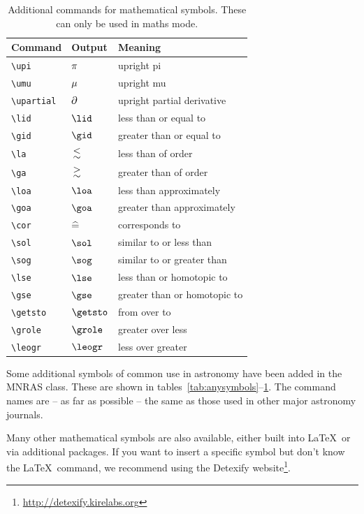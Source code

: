 \documentclass[a4paper,fleqn,usenatbib,useAMS]{mnras}
\begin{document}
\begin{table}
 \caption{Additional commands for mathematical symbols. These can only be used in maths mode.}
 \label{tab:mathssymbols}
 \begin{tabular}{lll}
  \hline
  Command & Output & Meaning\\
  \hline
  \verb'\upi' & $\pi$ & upright pi\\[2pt] %
  \verb'\umu' & $\mu$ & upright mu\\[2pt]
  \verb'\upartial' & $\partial$ & upright partial derivative\\[2pt]
  \verb'\lid' & $\lid$ & less than or equal to\\[2pt]
  \verb'\gid' & $\gid$ & greater than or equal to\\[2pt]
  \verb'\la' & $\la$ & less than of order\\[2pt]
  \verb'\ga' & $\ga$ & greater than of order\\[2pt]
  \verb'\loa' & $\loa$ & less than approximately\\[2pt]
  \verb'\goa' & $\goa$ & greater than approximately\\[2pt]
  \verb'\cor' & $\cor$ & corresponds to\\[2pt]
  \verb'\sol' & $\sol$ & similar to or less than\\[2pt]
  \verb'\sog' & $\sog$ & similar to or greater than\\[2pt]
  \verb'\lse' & $\lse$ & less than or homotopic to \\[2pt]
  \verb'\gse' & $\gse$ & greater than or homotopic to\\[2pt]
  \verb'\getsto' & $\getsto$ & from over to\\[2pt]
  \verb'\grole' & $\grole$ & greater over less\\[2pt]
  \verb'\leogr' & $\leogr$ & less over greater\\
  \hline
 \end{tabular}
\end{table}

Some additional symbols of common use in astronomy have been added in the MNRAS class. These are shown in tables~\ref{tab:anysymbols}--\ref{tab:mathssymbols}. The command names are -- as far as possible -- the same as those used in other major astronomy journals.

Many other mathematical symbols are also available, either built into \LaTeX\ or via additional packages. If you want to insert a specific symbol but don't know the \LaTeX\ command, we recommend using the Detexify website\footnote{\url{http://detexify.kirelabs.org}}.
\end{document}
